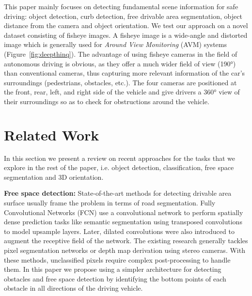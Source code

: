 \documentclass[10pt,twocolumn,letterpaper]{article}
\begin{document}
This paper mainly focuses on detecting fundamental scene information for safe driving: object detection, curb detection, free drivable area segmentation, object distance from the camera and object orientation. We test our approach on a novel dataset consisting of fisheye images. A fisheye image is a wide-angle and distorted image which is generally used for \textit{Around View Monitoring} (AVM) systems (Figure~\ref{fig:deepthinq}). 
The advantage of using fisheye cameras in the field of autonomous driving is obvious, as they offer a much wider field of view (\ang{190}) than conventional cameras, thus capturing more relevant information of the car's surroundings (pedestrians, obstacles, etc.).
The four cameras are positioned at the front, rear, left, and right side of the vehicle and give drivers a \ang{360} view of their surroundings so as to check for obstructions around the vehicle.


\section{Related Work}

In this section we present a review on recent approaches for the tasks that we explore in the rest of the paper, i.e. object detection, classification, free space segmentation and 3D orientation. 


\textbf{Free space detection: } State-of-the-art methods for detecting drivable area surface usually frame the problem in terms of road segmentation. Fully Convolutional Networks (FCN) \cite{fcn} use a convolutional network to perform spatially dense prediction tasks like semantic segmentation using transposed convolutions to model upsample layers. Later, dilated convolutions \cite{dilated} were also introduced to augment the receptive field of the network. The existing research generally tackles pixel segmentation networks or depth map derivation using stereo cameras. With these methods, unclassified pixels require complex post-processing to handle them. In this paper we propose using a simpler architecture for detecting obstacles and free space detection by identifying the bottom points of each obstacle in all directions of the driving vehicle.
\end{document}
